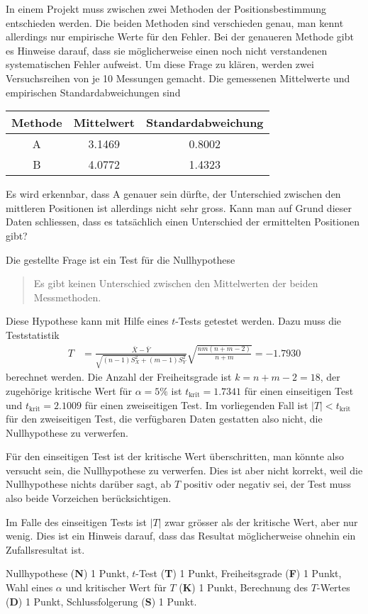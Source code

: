 In einem Projekt muss zwischen zwei Methoden der Positionsbestimmung
entschieden werden.
Die beiden Methoden sind verschieden genau, man kennt allerdings nur
empirische Werte für den Fehler.
Bei der genaueren Methode gibt es Hinweise darauf, dass sie möglicherweise einen
noch nicht verstandenen systematischen Fehler aufweist.
Um diese Frage zu klären, werden zwei Versuchsreihen von je 10 Messungen
gemacht.
Die gemessenen Mittelwerte und empirischen Standardabweichungen sind
\begin{center}
\begin{tabular}{|c|cc|}
\hline
Methode&Mittelwert&Standardabweichung\\
\hline
A      & 3.1469   &   0.8002         \\
B      & 4.0772   &   1.4323         \\
\hline
\end{tabular}
\end{center}
Es wird erkennbar, dass A genauer sein dürfte, der Unterschied zwischen
den mittleren Positionen ist allerdings nicht sehr gross.
Kann man auf Grund dieser Daten schliessen, dass es tatsächlich einen
Unterschied der ermittelten Positionen gibt?


\begin{loesung}
Die gestellte Frage ist ein Test für die Nullhypothese 
\begin{quote}
Es gibt keinen Unterschied zwischen den Mittelwerten der
beiden Messmethoden.
\end{quote}
Diese Hypothese kann mit Hilfe eines $t$-Tests getestet werden.
Dazu muss die Teststatistik
\begin{align*}
T
&=
\frac{\bar{X}-\bar{Y}}{\sqrt{(n-1)S_X^2 + (m-1)S_Y^2}}
\sqrt{\frac{nm(n+m-2)}{n+m}}
=-1.7930
\end{align*}
berechnet werden.
Die Anzahl der Freiheitsgrade ist $k=n+m-2 = 18$, der zugehörige kritische
Wert für $\alpha=5\%$ ist $t_{\text{krit}}=1.7341$ für einen
einseitigen Test und $t_{\text{krit}}=2.1009$ für einen zweiseitigen Test.
Im vorliegenden Fall ist $|T|<t_{\text{krit}}$ für den zweiseitigen Test,
die verfügbaren Daten gestatten also nicht, die Nullhypothese zu verwerfen.

Für den einseitigen Test ist der kritische Wert überschritten, man könnte
also versucht sein, die Nullhypothese zu verwerfen.
Dies ist aber nicht korrekt, weil die Nullhypothese nichts darüber
sagt, ab $T$ positiv oder negativ sei, der Test muss also beide
Vorzeichen berücksichtigen.

Im Falle des einseitigen Tests ist $|T|$ zwar grösser als der kritische
Wert, aber nur wenig.
Dies ist ein Hinweis darauf, dass das Resultat möglicherweise ohnehin
ein Zufallsresultat ist.
\end{loesung}

\begin{bewertung}
Nullhypothese ({\bf N}) 1 Punkt,
$t$-Test ({\bf T}) 1 Punkt,
Freiheitsgrade ({\bf F}) 1 Punkt,
Wahl eines $\alpha$ und kritischer Wert für $T$ ({\bf K}) 1 Punkt,
Berechnung des $T$-Wertes ({\bf D}) 1 Punkt,
Schlussfolgerung ({\bf S}) 1 Punkt.
\end{bewertung}



